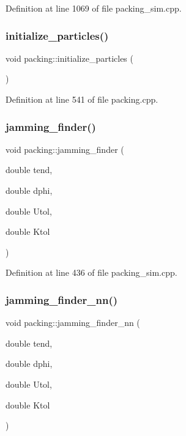 Definition at line 1069 of file packing\+\_\+sim.\+cpp.

\mbox{\label{classpacking_a87d6f5a31dd8c3c0f30c40f6e8b478f2}} 
\subsubsection{\texorpdfstring{initialize\+\_\+particles()}{initialize\_particles()}}
{\footnotesize\ttfamily void packing\+::initialize\+\_\+particles (\begin{DoxyParamCaption}{ }\end{DoxyParamCaption})}



Definition at line 541 of file packing.\+cpp.

\mbox{\label{classpacking_aa78e20cbe7bb48eb52a319a7eaac0b92}} 
\subsubsection{\texorpdfstring{jamming\+\_\+finder()}{jamming\_finder()}}
{\footnotesize\ttfamily void packing\+::jamming\+\_\+finder (\begin{DoxyParamCaption}\item[{double}]{tend,  }\item[{double}]{dphi,  }\item[{double}]{Utol,  }\item[{double}]{Ktol }\end{DoxyParamCaption})}



Definition at line 436 of file packing\+\_\+sim.\+cpp.

\mbox{\label{classpacking_a09872b70b71323f159a3490073aa1741}} 
\subsubsection{\texorpdfstring{jamming\+\_\+finder\+\_\+nn()}{jamming\_finder\_nn()}}
{\footnotesize\ttfamily void packing\+::jamming\+\_\+finder\+\_\+nn (\begin{DoxyParamCaption}\item[{double}]{tend,  }\item[{double}]{dphi,  }\item[{double}]{Utol,  }\item[{double}]{Ktol }\end{DoxyParamCaption})}



